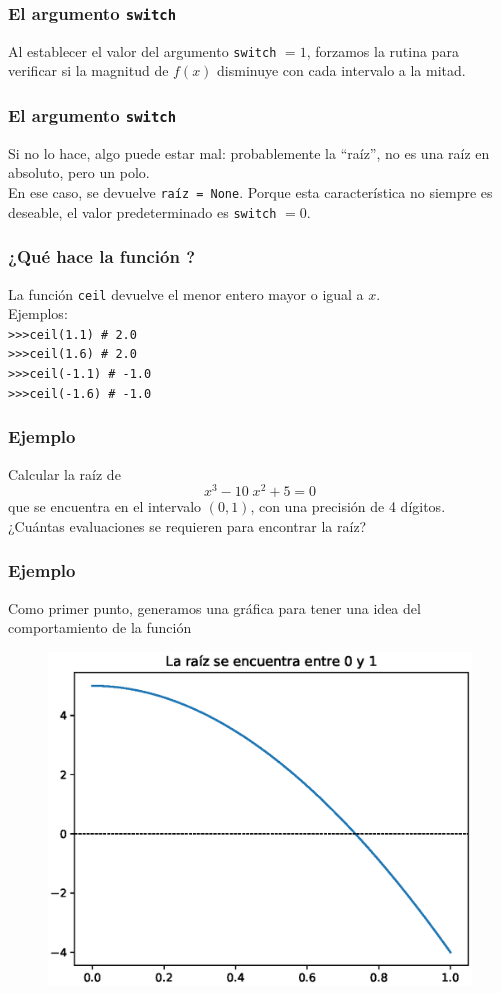 \begin{frame}
\frametitle{El argumento \texttt{switch}}
Al establecer el valor del argumento \texttt{switch} $=1$, forzamos
la rutina para verificar si la magnitud de $f(x)$ disminuye con cada intervalo
a la mitad.
\end{frame}
\begin{frame}
\frametitle{El argumento \texttt{switch}}
Si no lo hace, algo puede estar mal: probablemente la \enquote{raíz}, no es una raíz
en absoluto, pero un polo.
\\
\bigskip
En ese caso, se devuelve \texttt{raíz = None}. Porque esta característica no siempre es
deseable, el valor predeterminado es \texttt{switch} $=0$.
\end{frame}
\begin{frame}[fragile]
\frametitle{¿Qué hace la función ?}
La función \texttt{ceil} devuelve el menor entero mayor o igual a $x$.
\\
\medskip
Ejemplos:\\
\medskip
\verb|>>>ceil(1.1) # 2.0| \\
\verb|>>>ceil(1.6) # 2.0| \\
\verb|>>>ceil(-1.1) # -1.0| \\
\verb|>>>ceil(-1.6) # -1.0|
\end{frame}
\begin{frame}[fragile]
\frametitle{Ejemplo}
Calcular la raíz de 
\[ x^{3} - 10 \; x^{2} + 5 = 0 \]
que se encuentra en el intervalo $(0,1)$, con una precisión de 4 dígitos. 
\\
\bigskip
¿Cuántas evaluaciones se requieren para encontrar la raíz?
\end{frame}
\begin{frame}[fragile]
\frametitle{Ejemplo}
Como primer punto, generamos una gráfica para tener una idea del comportamiento de la función
\begin{figure}
	\centering
	\includegraphics[scale=0.5]{Imagenes/Ejercicio_4_2_Libro.eps}
\end{figure}
\end{frame}
